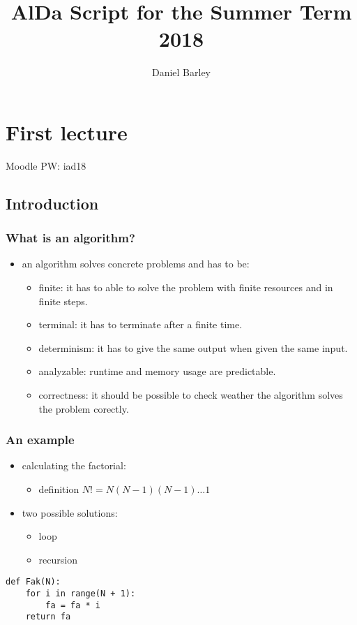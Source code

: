 \documentclass[a4paper]{article}
\title{AlDa Script for the Summer Term 2018}
\author{Daniel Barley}
\begin{document}
\maketitle

\tableofcontents

\newpage

\section{First lecture}
\begin{huge}
    Moodle PW: iad18
\end{huge}
\subsection{Introduction}
\subsubsection{What is an algorithm?}
\begin{itemize}
    \item an algorithm solves concrete problems and has to be:
        \begin{itemize}
            \item finite: it has to able to solve the problem with finite resources and in finite steps.
            \item terminal: it has to terminate after a finite time.
            \item determinism: it has to give the same output when given the same input.
            \item analyzable: runtime and memory usage are predictable.
            \item correctness: it should be possible to check weather the algorithm solves the problem corectly.
        \end{itemize}
\end{itemize}
\subsubsection{An example}
\begin{itemize}
    \item calculating the factorial:
        \begin{itemize}
            \item definition $ N! = N (N-1)(N-1) \dots 1 $
        \end{itemize}
    \item two possible solutions:
        \begin{itemize}
            \item loop
            \item recursion
        \end{itemize}
\end{itemize}
\begin{lstlisting}
def Fak(N):
    for i in range(N + 1):
        fa = fa * i
    return fa
\end{lstlisting}
\end{document}
